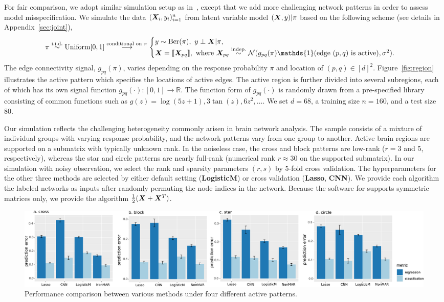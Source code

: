 \documentclass[11pt]{article}
\theoremstyle{plain}
\theoremstyle{definition}
\def\LogisticM{\text{\bf \small LogisticM }}
\begin{document}
For fair comparison, we adopt similar simulation setup as in~\cite{relion2019network}, except that we add more challenging network patterns in order to assess model misspecification. We simulate the data $(\bm X_i, y_i)_{i=1}^n$ from latent variable model $(\bm X,y)|\pi$ based on the following scheme (see details in Appendix~\ref{sec:joint}),
\[
\pi \stackrel{\text{i.i.d.}}{\sim} \text{Uniform}[0,1] \stackrel{\text{conditional on $\pi$}}{\longrightarrow}
\begin{cases}
y\sim \text{Ber}(\pi),\ \text{}y\perp \mX|\pi, \\
\mX=\entry{\mX_{pq}}, \ \text{where\ } \mX_{pq}\stackrel{\text{indep.}}{\sim} \tN(g_{pq}(\pi)\mathds{1}(\text{edge $(p,q)$ is active}), \sigma^2).
\end{cases}
\]
The edge connectivity signal, $g_{pq}(\pi)$, varies depending on the response probability $\pi$ and location of $(p,q)\in[d]^2$. Figure~\ref{fig:region} illustrates the active pattern which specifies the locations of active edges. The active region is further divided into several subregions, each of which has its own signal function $g_{pq}(\cdot)\colon [0,1]\to \mathbb{R}$. The function form of $g_{pq}(\cdot)$ is randomly drawn from a pre-specified library consisting of common functions such as $g(z)=\log(5z+1), 3\tan(z),6z^2,\ldots$. We set $d=68$, a training size $n=160$, and a test size $80$. 

Our simulation reflects the challenging heterogeneity commonly arisen in brain network analysis. The sample consists of a mixture of individual groups with varying response probability, and the network patterns vary from one group to another. Active brain regions are supported on a submatrix with typically unknown rank. In the noiseless case, the cross and block patterns are low-rank ($r = 3$ and 5, respectively), whereas the star and circle patterns are nearly full-rank (numerical rank $r\approx 30$ on the supported submatrix). In our simulation with noisy observation, we select the rank and sparsity parameters $(r,s)$ by 5-fold cross validation. The hyperparameters for the other three methods are selected by either default setting ({\bf \small LogisticM}) or cross validation ({\bf \small Lasso}, {\small \bf CNN}). We provide each algorithm the labeled networks as inputs after randomly permuting the node indices in the network. Because the software for \LogisticM supports symmetric matrices only, we provide the algorithm ${1\over 2}(\bm X+\bm X^T)$. 

\begin{figure}[ht]
    \centering
    \includegraphics[width=\textwidth]{error_tot_comb2.pdf}
    \caption{Performance comparison between various methods under four different active patterns. }\label{fig:compare}
\end{figure}
\end{document}
